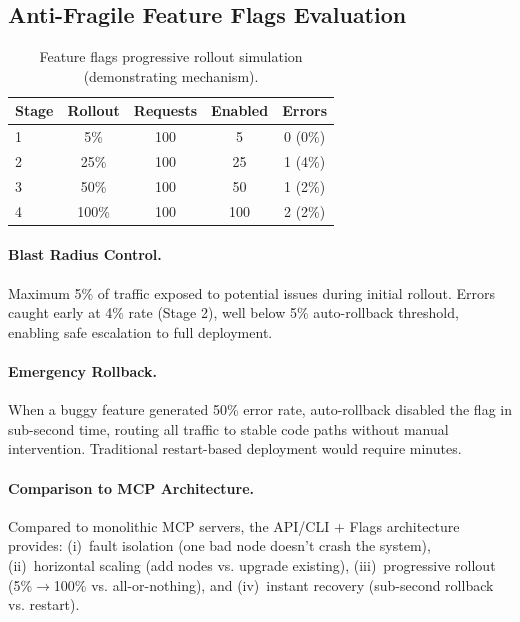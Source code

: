 \documentclass[11pt]{article}
\begin{document}
\subsection{Anti-Fragile Feature Flags Evaluation}

\begin{table}[H]
\centering
\caption{Feature flags progressive rollout simulation (demonstrating mechanism).}
\label{tab:flags_results}
\small
{}
\begin{tabular}{lcccc}
\toprule
\textbf{Stage} & \textbf{Rollout} & \textbf{Requests} & \textbf{Enabled} & \textbf{Errors} \\
\midrule
1 & 5\%   & 100 & 5  & 0 (0\%) \\
2 & 25\%  & 100 & 25 & 1 (4\%) \\
3 & 50\%  & 100 & 50 & 1 (2\%) \\
4 & 100\% & 100 & 100 & 2 (2\%) \\
\bottomrule
\end{tabular}
\end{table}

\paragraph{Blast Radius Control.}
Maximum 5\% of traffic exposed to potential issues during initial rollout.
Errors caught early at 4\% rate (Stage 2), well below 5\% auto-rollback
threshold, enabling safe escalation to full deployment.

\paragraph{Emergency Rollback.}
When a buggy feature generated 50\% error rate, auto-rollback disabled the
flag in sub-second time, routing all traffic to stable code paths without
manual intervention. Traditional restart-based deployment would require
minutes.

\paragraph{Comparison to MCP Architecture.}
Compared to monolithic MCP servers, the API/CLI + Flags architecture provides:
(i)~fault isolation (one bad node doesn't crash the system), (ii)~horizontal
scaling (add nodes vs. upgrade existing), (iii)~progressive rollout
(5\%$\rightarrow$100\% vs. all-or-nothing), and (iv)~instant recovery
(sub-second rollback vs. restart).
\end{document}
